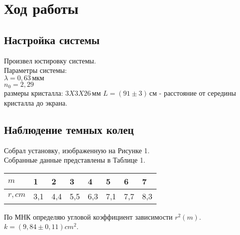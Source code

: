 

\section{Ход работы}

\subsection{Настройка системы}

Произвел юстировку системы. \\

Параметры системы: \\
$ \lambda = 0,63 \, \texttt{мкм} $ \\
$ n_0 = 2,29 $ \\
размеры кристалла: $ 3 X 3 X 26 \, \texttt{мм} $
$ L = \left( 91\pm 3 \right) \, \texttt{см} $ - расстояние от середины кристалла до экрана.

\subsection{Наблюдение темных колец}

Собрал установку, изображенную на Рисунке 1. \\

Собранные данные представлены в Таблице 1.

\begin{table}[h!]
    \begin{center}
        \begin{tabular}{|l|l|l|l|l|l|l|l|}
        \hline
        $ m $     & 1   & 2   & 3   & 4   & 5   & 6   & 7   \\ \hline
        $ r, cm $ & 3,1 & 4,4 & 5,5 & 6,3 & 7,1 & 7,7 & 8,3 \\ \hline
        \end{tabular}
    \end{center}
\end{table}

\begin{center}
\end{center}

По МНК определяю угловой коэффициент зависимости $ r^2(m) $. \\
$ k = \left( 9,84 \pm 0,11 \right) cm^2 $. \\

